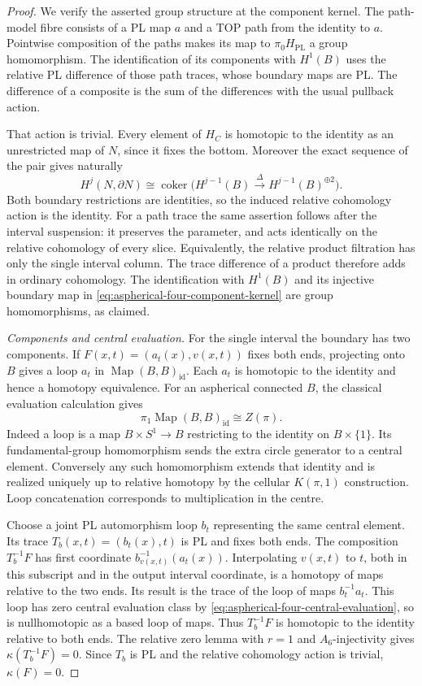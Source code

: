 \begin{proof}
We verify the asserted group structure at the component
kernel.  The path-model fibre consists of a PL map $a$
and a TOP path from the identity to $a$.  Pointwise
composition of the paths makes its map to
$\pi_0H_{\mathrm{PL}}$ a group homomorphism.
The identification of its components with $H^1(B)$
uses the relative PL difference of those path traces,
whose boundary maps are PL.  The difference of a
composite is the sum of the differences with the usual
pullback action.

That action is trivial.  Every element of $H_C$ is
homotopic to the identity as an unrestricted map of
$N$, since it fixes the bottom.  Moreover the exact
sequence of the pair gives naturally
\[
 H^j(N,\partial N)\cong
 \operatorname{coker}\bigl(H^{j-1}(B)
       \xrightarrow{\Delta}H^{j-1}(B)^{\oplus2}\bigr).
\]
Both boundary restrictions are identities, so the
induced relative cohomology action is the identity.
For a path trace the same assertion follows after
the interval suspension: it preserves the parameter,
and acts identically on the relative cohomology of
every slice.  Equivalently, the relative product
filtration has only the single interval column.
The trace difference of a product therefore adds in
ordinary cohomology.  The identification with $H^1(B)$
and its injective boundary map in
\eqref{eq:aspherical-four-component-kernel} are group
homomorphisms, as claimed.

\emph{Components and central evaluation.}
For the single interval the boundary has two components.
If $F(x,t)=(a_t(x),v(x,t))$ fixes both ends, projecting
onto $B$ gives a loop $a_t$ in
$\operatorname{Map}(B,B)_{\mathrm{id}}$.  Each $a_t$
is homotopic to the identity and hence a homotopy
equivalence.  For an aspherical connected $B$,
the classical evaluation calculation gives
\cite[Lemma~4.3, p.~3336]{EnkelmannEtAl2018Atheory}
\begin{equation}\label{eq:aspherical-four-central-evaluation}
 \pi_1\operatorname{Map}(B,B)_{\mathrm{id}}\cong Z(\pi).
\end{equation}
Indeed a loop is a map $B\times S^1\to B$ restricting
to the identity on $B\times\{1\}$.  Its fundamental-group
homomorphism sends the extra circle generator to a
central element.  Conversely any such homomorphism
extends that identity and is realized uniquely up to
relative homotopy by the cellular $K(\pi,1)$ construction.
Loop concatenation corresponds to multiplication in
the centre.

Choose a joint PL automorphism loop $b_t$ representing
the same central element.  Its trace $T_b(x,t)=(b_t(x),t)$
is PL and fixes both ends.  The composition $T_b^{-1}F$
has first coordinate $b_{v(x,t)}^{-1}(a_t(x))$.
Interpolating $v(x,t)$ to $t$, both in this subscript
and in the output interval coordinate, is a homotopy
of maps relative to the two ends.  Its result is the
trace of the loop of maps $b_t^{-1}a_t$.  This loop
has zero central evaluation class by
\eqref{eq:aspherical-four-central-evaluation}, so is
nullhomotopic as a based loop of maps.  Thus
$T_b^{-1}F$ is homotopic to the identity relative to
both ends.  The relative zero lemma with $r=1$ and
$A_6$-injectivity gives $\kappa(T_b^{-1}F)=0$.
Since $T_b$ is PL and the relative cohomology action
is trivial, $\kappa(F)=0$.


\end{proof}
